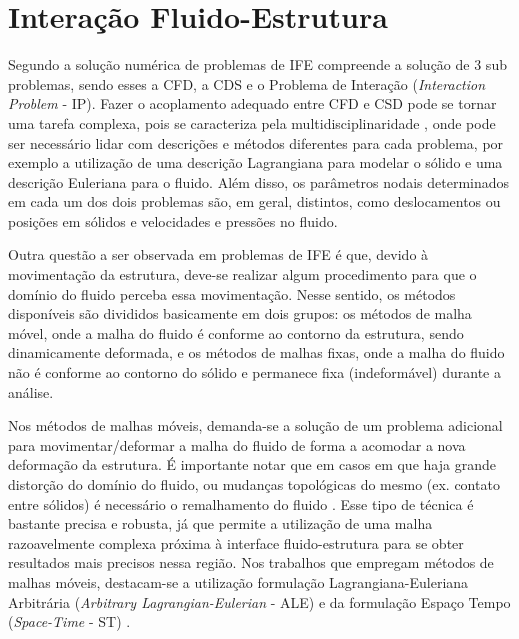 \section{Interação Fluido-Estrutura} \label{IFE}

Segundo  a solução numérica de problemas de IFE compreende a solução de 3 sub problemas, sendo esses a CFD, a CDS e o Problema de Interação (\textit{Interaction Problem} - IP). Fazer o acoplamento adequado entre CFD e CSD pode se tornar uma tarefa complexa, pois se caracteriza pela multidisciplinaridade \cite{hou2012numerical}, onde pode ser necessário lidar com descrições e métodos diferentes para cada problema, por exemplo a utilização de uma descrição Lagrangiana para modelar o sólido e uma descrição Euleriana para o fluido. Além disso, os parâmetros nodais determinados em cada um dos dois problemas são, em geral, distintos, como deslocamentos ou posições em sólidos e velocidades e pressões no fluido.

Outra questão a ser observada em problemas de IFE é que, devido à movimentação da estrutura, deve-se realizar algum procedimento para que o domínio do fluido perceba essa movimentação. Nesse sentido, os métodos disponíveis são divididos basicamente em dois grupos: os métodos de malha móvel, onde a malha do fluido é conforme ao contorno da estrutura, sendo dinamicamente deformada, e os métodos de malhas fixas, onde a malha do fluido não é conforme ao contorno do sólido e permanece fixa (indeformável) durante a análise.

Nos métodos de malhas móveis, demanda-se a solução de um problema adicional para movimentar/deformar a malha do fluido de forma a acomodar a nova deformação da estrutura. É importante notar que em casos em que haja grande distorção do domínio do fluido, ou mudanças topológicas do mesmo (ex. contato entre sólidos) é necessário o remalhamento do fluido \cite{terahara2020heart}. Esse tipo de técnica é bastante precisa e robusta, já que permite a utilização de uma malha razoavelmente complexa próxima à interface fluido-estrutura para se obter resultados mais precisos nessa região. Nos trabalhos que empregam métodos de malhas móveis, destacam-se a utilização formulação Lagrangiana-Euleriana Arbitrária (\textit{Arbitrary Lagrangian-Eulerian} - ALE) \cite{donea1982arbitrary,kanchi20073d,fernandes2019ale} e da formulação Espaço Tempo (\textit{Space-Time} - ST) \cite{takizawa2011multiscale,terahara2020heart,takizawa2011stabilized}.

